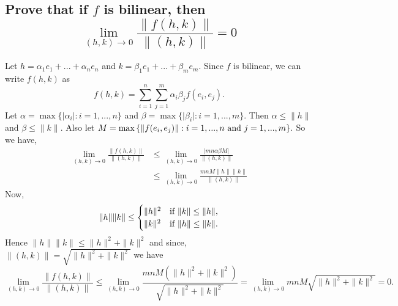 \begin{parts}
    \part{
        Prove that if $f$ is bilinear, then
        $$\lim_{(h,k)\to 0}{
            \frac{\|f(h,k)\|}{\|(h,k)\|}
        }=0$$
    }
    \begin{solution}
        Let $h=\alpha_1e_1+...+\alpha_ne_n$
        and $k=\beta_1e_1+...+\beta_me_m$.
        Since $f$ is bilinear, we can write
        $f(h,k)$ as
        $$f(h,k)=\sum_{i=1}^n{
            \sum_{j=1}^m{
                \alpha_i\beta_jf(e_i,e_j)
            }
        }.
        $$
        Let $\alpha=\max{
        \{\vert\alpha_i\vert:
        i=1,...,n\}}$ and $\beta=
        \max{\{\vert\beta_i\vert:
        i=1,...,m\}}.$
        Then $\alpha\le\|h\|$ and
        $\beta\le\|k\|$. Also let
        $M=\max{\{\|f(e_i,e_j)\|:i=1,...,n
        \textnormal{ and } j=1,...,m\}}.$
        So we have,
        \begin{align*}
        \lim_{(h,k)\to 0}{
            \frac{\|f(h,k)\|}{\|(h,k)\|}
        }
        &\le\lim_{(h,k)\to 0}{
            \frac{\vert mn\alpha\beta M\vert}
            {\|(h,k)\|}
        }\\
        &\le\lim_{(h,k)\to 0}{
            \frac{mnM\|h\|\|k\|}{\|(h,k)\|}
        }
        \end{align*}
        Now,
        $$
        \|h\|\|k\|\le
        \begin{cases}
            \|h\|^2 & 
            \textnormal{if }\|k\|\le\|h\|,\\
            \|k\|^2 &
            \textnormal{if }\|h\|\le\|k\|.
        \end{cases}
        $$
        Hence $\|h\|\|k\|\le\|h\|^2+\|k\|^2$
        and since, $\|(h,k)\|=\sqrt{
        \|h\|^2+\|k\|^2}$ we have
        $$\lim_{(h,k)\to 0}{
            \frac{\|f(h,k)\|}{\|(h,k)\|}
        }\le
        \lim_{(h,k)\to 0}{
            \frac{mnM(\|h\|^2+\|k\|^2)}
            {\sqrt{\|h\|^2+\|k\|^2}}
        }
        =\lim_{(h,k)\to 0}{mnM
        \sqrt{\|h\|^2+\|k\|^2}}=0.$$
    \end{solution}

\end{parts}
